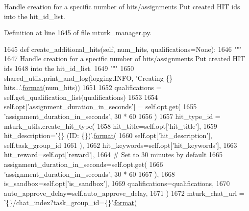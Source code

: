\begin{DoxyVerb}Handle creation for a specific number of hits/assignments Put created HIT ids
into the hit_id_list.
\end{DoxyVerb}
 

Definition at line 1645 of file mturk\+\_\+manager.\+py.


\begin{DoxyCode}
1645     \textcolor{keyword}{def }create\_additional\_hits(self, num\_hits, qualifications=None):
1646         \textcolor{stringliteral}{"""}
1647 \textcolor{stringliteral}{        Handle creation for a specific number of hits/assignments Put created HIT ids}
1648 \textcolor{stringliteral}{        into the hit\_id\_list.}
1649 \textcolor{stringliteral}{        """}
1650         shared\_utils.print\_and\_log(logging.INFO, \textcolor{stringliteral}{'Creating \{\} hits...'}.\hyperlink{namespaceparlai_1_1chat__service_1_1services_1_1messenger_1_1shared__utils_a32e2e2022b824fbaf80c747160b52a76}{format}(num\_hits))
1651 
1652         qualifications = self.get\_qualification\_list(qualifications)
1653 
1654         self.opt[\textcolor{stringliteral}{'assignment\_duration\_in\_seconds'}] = self.opt.get(
1655             \textcolor{stringliteral}{'assignment\_duration\_in\_seconds'}, 30 * 60
1656         )
1657         hit\_type\_id = mturk\_utils.create\_hit\_type(
1658             hit\_title=self.opt[\textcolor{stringliteral}{'hit\_title'}],
1659             hit\_description=\textcolor{stringliteral}{'\{\} (ID: \{\})'}.\hyperlink{namespaceparlai_1_1chat__service_1_1services_1_1messenger_1_1shared__utils_a32e2e2022b824fbaf80c747160b52a76}{format}(
1660                 self.opt[\textcolor{stringliteral}{'hit\_description'}], self.task\_group\_id
1661             ),
1662             hit\_keywords=self.opt[\textcolor{stringliteral}{'hit\_keywords'}],
1663             hit\_reward=self.opt[\textcolor{stringliteral}{'reward'}],
1664             \textcolor{comment}{# Set to 30 minutes by default}
1665             assignment\_duration\_in\_seconds=self.opt.get(
1666                 \textcolor{stringliteral}{'assignment\_duration\_in\_seconds'}, 30 * 60
1667             ),
1668             is\_sandbox=self.opt[\textcolor{stringliteral}{'is\_sandbox'}],
1669             qualifications=qualifications,
1670             auto\_approve\_delay=self.auto\_approve\_delay,
1671         )
1672         mturk\_chat\_url = \textcolor{stringliteral}{'\{\}/chat\_index?task\_group\_id=\{\}'}.\hyperlink{namespaceparlai_1_1chat__service_1_1services_1_1messenger_1_1shared__utils_a32e2e2022b824fbaf80c747160b52a76}{format}(

\end{DoxyCode}
